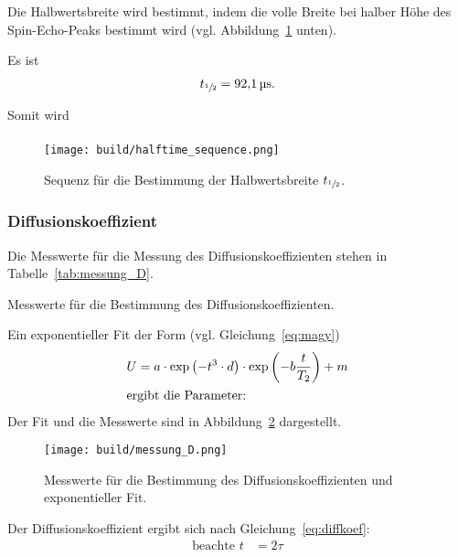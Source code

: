 Die Halbwertsbreite wird bestimmt, indem die volle Breite bei halber Höhe des Spin-Echo-Peaks bestimmt wird (vgl. Abbildung~\ref{fig:halftime_sequence} unten).

Es ist
\begin{align}%
  \label{eq:t_1/2}
  t_{\sfrac{1}{2}} = \SI{92.1}{\micro\second}.
\end{align}

Somit wird
\begin{align}%
  \label{eq:g}
  
\end{align}



\begin{figure}[ht]
  \centering
  \texttt{[image: build/halftime\_sequence.png]}
  \caption{Sequenz für die Bestimmung der Halbwertsbreite $t_{\sfrac{1}{2}}$.}%
  \label{fig:halftime_sequence}
\end{figure}


\subsubsection{Diffusionskoeffizient}%
\label{sub:diffusionskoeefizient}
Die Messwerte für die Messung des Diffusionskoeffizienten stehen in Tabelle~\ref{tab:messung_D}.

\begin{table}[ht]
  \centering
  \caption{Messwerte für die Bestimmung des Diffusionskoeffizienten.}%
  \label{tab:messung_D}
  
\end{table}

Ein exponentieller Fit der Form (vgl. Gleichung~\eqref{eq:magy})
\begin{align*}
  U &= a \cdot \exp{\left(- t^3 \cdot d\right)} \cdot \exp{\left(-b \frac{t}{T_2}\right)}+ m \\
  \intertext{ergibt die Parameter:}
  
\end{align*}
Der Fit und die Messwerte sind in Abbildung~\ref{fig:messung_D} dargestellt.

\begin{figure}[ht]
  \centering
  \texttt{[image: build/messung\_D.png]}
  \caption{Messwerte für die Bestimmung des Diffusionskoeffizienten und exponentieller Fit.}%
  \label{fig:messung_D}
\end{figure}

Der Diffusionskoeffizient ergibt sich nach Gleichung~\eqref{eq:diffkoef}:
\begin{align}%
  \nonumber \text{beachte }t &= 2\tau \\
  \label{eq:d}
  
\end{align}


